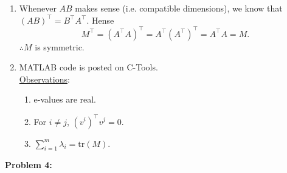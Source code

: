 \documentclass[letterpaper]{article}
\begin{document}
\begin{enumerate}
\item Whenever $AB$ makes sense (i.e. compatible dimensions), we know that $(AB)^\top = B^\top A^\top.$ Hense
$$M^\top = (A^\top A)^\top = A^\top(A^\top)^\top = A^\top A = M.$$
$\therefore M$ is symmetric.

\item MATLAB code is posted on C-Tools.
\medskip \\
\underline{Observations}:
\begin{enumerate}
\setlength{\itemsep}{.1in}
\renewcommand{\labelenumii}{\roman{enumii}.}

 \item e-values are real.

 \item For $i\neq j$, $(v^i)^\top v^j = 0$.

 \item $\sum \limits_{i=1}^{m}\lambda_i=\mathrm{tr}(M).$

\end{enumerate}

\end{enumerate}

\bigskip
\newpage
\noindent \textbf{Problem 4:}
\end{document}
